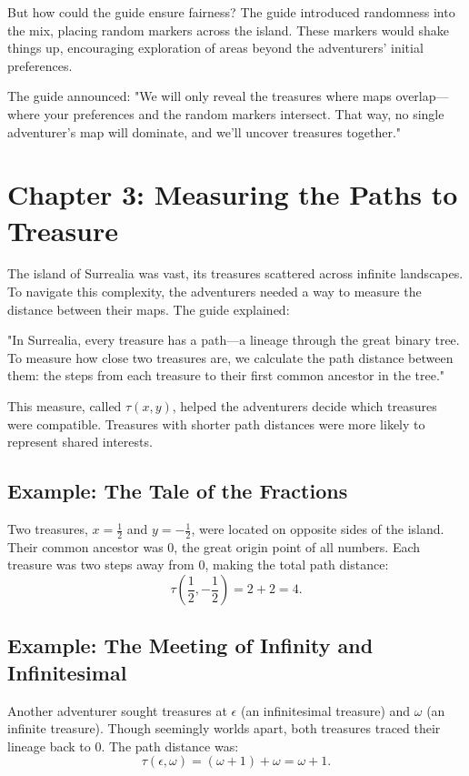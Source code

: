 \documentclass[12pt]{article}
\begin{document}
But how could the guide ensure fairness? The guide introduced randomness into the mix, placing random markers across the island. These markers would shake things up, encouraging exploration of areas beyond the adventurers’ initial preferences.

The guide announced: "We will only reveal the treasures where maps overlap—where your preferences and the random markers intersect. That way, no single adventurer’s map will dominate, and we’ll uncover treasures together."

\section*{Chapter 3: Measuring the Paths to Treasure}

The island of Surrealia was vast, its treasures scattered across infinite landscapes. To navigate this complexity, the adventurers needed a way to measure the distance between their maps. The guide explained:

"In Surrealia, every treasure has a path—a lineage through the great binary tree. To measure how close two treasures are, we calculate the path distance between them: the steps from each treasure to their first common ancestor in the tree."

This measure, called \( \tau(x, y) \), helped the adventurers decide which treasures were compatible. Treasures with shorter path distances were more likely to represent shared interests.

\subsection*{Example: The Tale of the Fractions}

Two treasures, \( x = \frac{1}{2} \) and \( y = -\frac{1}{2} \), were located on opposite sides of the island. Their common ancestor was \( 0 \), the great origin point of all numbers. Each treasure was two steps away from \( 0 \), making the total path distance:
\[\tau\left(\frac{1}{2}, -\frac{1}{2}\right) = 2 + 2 = 4.\]

\subsection*{Example: The Meeting of Infinity and Infinitesimal}

Another adventurer sought treasures at \( \epsilon \) (an infinitesimal treasure) and \( \omega \) (an infinite treasure). Though seemingly worlds apart, both treasures traced their lineage back to \( 0 \). The path distance was:
\[\tau(\epsilon, \omega) = (\omega + 1) + \omega = \omega + 1.\]
\end{document}
